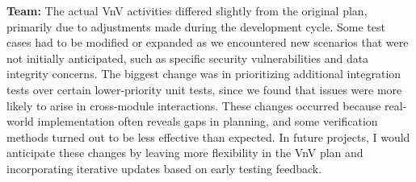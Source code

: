 \documentclass[12pt, titlepage]{article}
\begin{document}
\begin{enumerate}
  \textbf{Team: } The actual VnV activities differed slightly from the original plan, primarily due to adjustments made during the development cycle. Some test cases had to be modified or expanded as we encountered new scenarios that were not initially anticipated, such as specific security vulnerabilities and data integrity concerns. The biggest change was in prioritizing additional integration tests over certain lower-priority unit tests, since we found that issues were more likely to arise in cross-module interactions. These changes occurred because real-world implementation often reveals gaps in planning, and some verification methods turned out to be less effective than expected. In future projects, I would anticipate these changes by leaving more flexibility in the VnV plan and incorporating iterative updates based on early testing feedback.


\end{enumerate}
\end{document}
